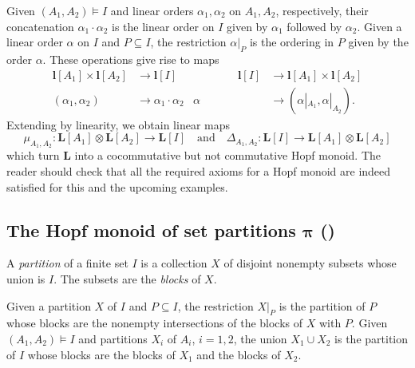\documentclass[10pt]{amsart}
\theoremstyle{definition}
\newcommand{\rL}{\mathbf{l}}
\newcommand{\bL}{\mathbf{L}}
\newcommand{\bPi}{\bpi}
\newcommand{\bpi}{\boldsymbol \pi}
\newcommand{\qand}{\quad\text{and}\quad}
\begin{document}
Given $(A_1,A_2)\models I$
and linear orders $\alpha_1,\alpha_2$ on $A_1,A_2$, respectively,
their concatenation $\alpha_1\cdot \alpha_2$ 
is the linear order on $I$ given by $\alpha_1$ followed by $\alpha_2$.
Given a linear order $\alpha$ on $I$ and $P\subseteq I$, the restriction 
 $\alpha|_P$ is the ordering in $P$ given by the order $\alpha$.
These operations give rise to maps
\begin{equation}\label{e:L}
\begin{aligned}
\rL[A_1]\times\rL[A_2] & \to \rL[I] &\qquad\qquad \rL[I] & \to \rL[A_1]\times\rL[A_2]\\
(\alpha_1,\alpha_2) & \to \alpha_1\cdot\alpha_2
& \alpha & \to (\alpha |_{A_1},\alpha |_{A_2}).
\end{aligned}
\end{equation}
Extending by linearity, we obtain linear maps
\[
 \mu_{A_1,A_2}:\bL[A_1]\otimes\bL[A_2] \to \bL[I]
 \qand
\Delta_{A_1,A_2}:\bL[I]\to \bL[A_1]\otimes\bL[A_2]
\]
which turn $\bL$ into a cocommutative but not commutative Hopf monoid. The reader should check that all the required axioms for a Hopf monoid are indeed satisfied for this and the upcoming examples.


\subsection{The Hopf monoid of set partitions \texorpdfstring{$\bPi$ (\cite{AM:2010})}{pi ([4])} }\label{ss:partition}

A \emph{partition} of a finite set $I$ is a collection $X$ of disjoint nonempty subsets whose union is $I$. The subsets are the \emph{blocks} of $X$.

Given a partition $X$ of $I$ and $P\subseteq I$, the restriction
$X|_P$ is the partition of $P$ whose blocks are 
the nonempty intersections of the blocks of $X$ with $P$.
Given $(A_1,A_2)\models I$
and partitions $X_i$ of $A_i$, $i=1,2$, 
the union $X_1\cup X_2$ is the partition of $I$ 
whose blocks are the blocks of $X_1$ and the blocks of $X_2$.
\end{document}
